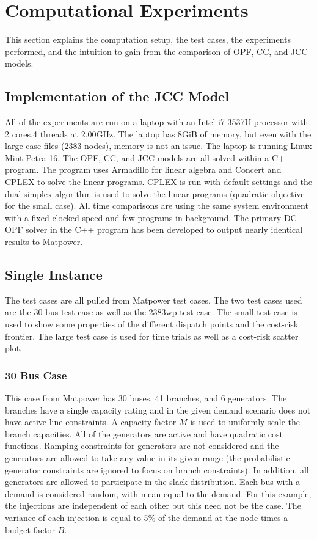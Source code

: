 \section{Computational Experiments}\label{computationalresults}
This section explains the computation setup, the test cases, the experiments performed, and the intuition to gain from the comparison of OPF, CC, and JCC models.
\subsection{Implementation of the JCC Model}
All of the experiments are run on a laptop with an Intel i7-3537U processor with 2 cores,4 threads at 2.00GHz.  The laptop has 8GiB of memory, but even with the large case files (2383 nodes), memory is not an issue.  The laptop is running Linux Mint Petra 16.  The OPF, CC, and JCC models are all solved within a C++ program.  The program uses Armadillo\cite{armadillo} for linear algebra and Concert and CPLEX to solve the linear programs.  CPLEX is run with default settings and the dual simplex algorithm is used to solve the linear programs (quadratic objective for the small case).  All time comparisons are using the same system environment with a fixed clocked speed and few programs in background.  The primary DC OPF solver in the C++ program has been developed to output nearly identical results to Matpower\cite{matpower}.
\subsection{Single Instance}
The test cases are all pulled from Matpower test cases.  The two test cases used are the 30 bus test case as well as the 2383wp test case.  The small test case is used to show some properties of the different dispatch points and the cost-risk frontier.  The large test case is used for time trials as well as a cost-risk scatter plot.  

\subsubsection*{30 Bus Case}
This case from Matpower has 30 buses, 41 branches, and 6 generators.  The branches have a single capacity rating and in the given demand scenario does not have active line constraints.  A capacity factor $M$ is used to uniformly scale the branch capacities.  All of the generators are active and have quadratic cost functions.  Ramping constraints for generators are not considered and the generators are allowed to take any value in its given range (the probabilistic generator constraints are ignored to focus on branch constraints).  In addition, all generators are allowed to participate in the slack distribution.  Each bus with a demand is considered random, with mean equal to the demand.  For this example, the injections are independent of each other but this need not be the case.  The variance of each injection is equal to 5\% of the demand at the node times a budget factor $B$.

